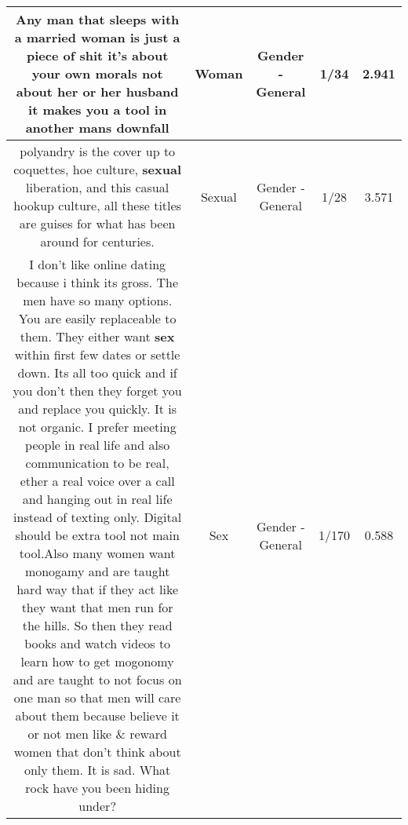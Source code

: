 \documentclass[11pt]{article}
\newlength\mylength
\begin{document}
\begin{center}
\begin{longtable}{|C{.65\mylength}|C{.30\mylength}|C{.12\mylength}|C{.12\mylength}|C{.12\mylength}|}
  \small Any man that sleeps with a married \textbf{woman} is just a piece of shit it's about your own morals not about her or her husband it makes you a tool in another mans downfall\normalsize   & Woman & Gender - General & 1/34 & 2.941 \\  \hline
  \small polyandry is the cover up to coquettes, hoe culture, \textbf{sexual} liberation, and this casual hookup culture, all these titles are guises for what has been around for centuries.\normalsize   & Sexual & Gender - General & 1/28 & 3.571 \\  \hline
  \small I don't like online dating because i think its gross. The men have so many options. You are easily replaceable to them. They either want \textbf{sex} within first few dates or settle down. Its all too quick and if you don't then they forget you and replace you quickly. It is not organic. I prefer meeting people in real life and also communication to be real, ether a real voice over a call and hanging out in real life instead of texting only. Digital should be extra tool not main tool.Also many women want monogamy and are taught hard way that if they act like they want that men run for the hills. So then they read books and watch videos to learn how to get mogonomy and are taught to not focus on one man so that men will care about them because believe it or not men like \& reward women that don't think about only them. It is sad. What rock have you been hiding under?\normalsize   & Sex & Gender - General & 1/170 & 0.588 \\  \hline

\end{longtable}
\end{center}
\end{document}
